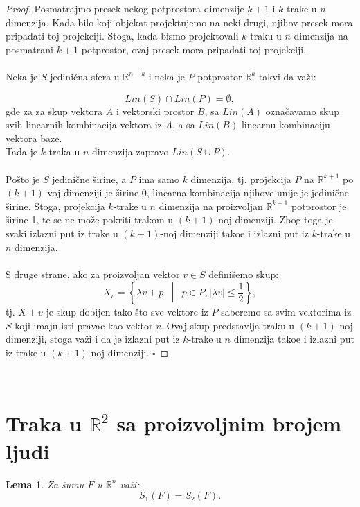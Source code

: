 \documentclass[11pt,letter]{article}
\newtheorem{lem}[teo]{\bf Lema}
\begin{document}
\begin{proof}
Posmatrajmo presek nekog potprostora dimenzije $k+1$ i $k$-trake u $n$ dimenzija. Kada bilo koji objekat projektujemo na neki drugi, njihov presek mora pripadati toj projekciji. Stoga, kada bismo projektovali $k$-traku u $n$ dimenzija na posmatrani $k+1$ potprostor, ovaj presek mora pripadati toj projekciji.
\\
\\
\indent Neka je $S$ jedini\v cna sfera u $\mathbb{R}^{n-k}$ i neka je $P$ potprostor $\mathbb{R}^k$ takvi da va\v zi:

$$Lin(S) \cap Lin(P)=\emptyset,$$
gde za za skup vektora $A$ i vektorski prostor $B$, sa $Lin(A)$ ozna\v cavamo skup svih linearnih kombinacija vektora iz $A$, a sa $Lin(B)$ linearnu kombinaciju vektora baze.
\\
Tada je $k$-traka u $n$ dimenzija zapravo $Lin(S\cup P)$. 
\\
\\
\indent Po\v sto je $S$ jedini\v cne \v sirine, a $P$ ima samo $k$ dimenzija, tj. projekcija $P$ na $\mathbb{R}^{k+1}$ po $(k+1)$-voj dimenziji je \v sirine 0, linearna kombinacija njihove unije je jedini\v cne \v sirine. Stoga, projekcija $k$-trake u $n$ dimenzija na proizvoljan $\mathbb{R}^{k+1}$ potprostor je \v sirine 1, te se ne mo\v ze pokriti trakom u $(k+1)$-noj dimenziji. Zbog toga je svaki izlazni put iz trake u $(k+1)$-noj dimenziji tako\dj e i izlazni put iz $k$-trake u $n$ dimenzija.
\\
\\
\indent S druge strane, ako za proizvoljan vektor $v\in S$ defini\v semo skup:
$$X_v=\left \{ \lambda v+p \phantom{a} \middle | \phantom{a}  p\in P, |\lambda v|\leqslant \frac{1}{2}\right \},$$
tj. $X+v$ je skup dobijen tako \v sto sve vektore iz $P$ saberemo sa svim vektorima iz $S$ koji imaju isti pravac kao vektor $v$. Ovaj skup predstavlja traku u $(k+1)$-noj dimenziji, stoga va\v zi i da je izlazni put iz $k$-trake u $n$ dimenzija tako\dj  e i izlazni put iz trake u $(k+1)$-noj dimenziji. $\square$
\end{proof}
\\

\section[Traka u $\mathbb{R}^2$ sa proizvoljnim brojem ljudi]{Traka u $\mathbb{R}^2$ sa proizvoljnim brojem ljudi}
\bigskip
\begin{lem} Za \v sumu $F$ u $\mathbb{R}^n$ va\v zi: $$S_1(F)=S_2(F).$$\end{lem}
\end{document}
